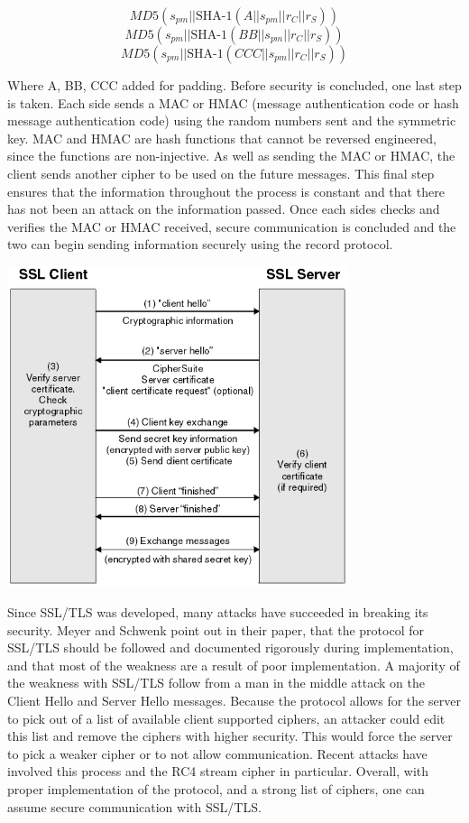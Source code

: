 \[ MD5(s_{pm}||\text{SHA-1}(A||s_{pm}||r_{C}||r_{S})) \]
\[ MD5(s_{pm}||\text{SHA-1}(BB||s_{pm}||r_{C}||r_{S})) \]
\[ MD5(s_{pm}||\text{SHA-1}(CCC||s_{pm}||r_{C}||r_{S})) \] 

Where A, BB, CCC added for padding\cite[p. 282]{trappe}.  Before security is
concluded, one last step is taken.  Each side sends a MAC or HMAC (message
authentication code or hash message authentication code) using the random
numbers sent and the symmetric key.  MAC and HMAC are hash functions that
cannot be reversed engineered, since the functions are non-injective.  As well
as sending the MAC or HMAC, the client sends another cipher to be used on the
future messages.  This final step ensures that the information throughout the
process is constant and that there has not been an attack on the information
passed.  Once each sides checks and verifies the MAC or HMAC received, secure
communication is concluded and the two can begin sending information
securely using the record protocol\cite[p. 58]{rescorla}.

\begin{center}
    \includegraphics[width=0.75\textwidth]{SSL_TLS_Diagram.png}
\end{center}

Since SSL/TLS was developed, many attacks have succeeded in breaking its
security.  Meyer and Schwenk point out in their paper, that the protocol for
SSL/TLS should be followed and documented rigorously during implementation, and
that most of the weakness are a result of poor implementation\cite[p.
14]{meyer}.  A majority of the weakness with SSL/TLS follow from a man in the
middle attack on the Client Hello and Server Hello messages.  Because the
protocol allows for the server to pick out of a list of available client
supported ciphers, an attacker could edit this list and remove the ciphers with
higher security.  This would force the server to pick a weaker cipher or to not
allow communication.  Recent attacks have involved this process and the RC4
stream cipher in particular.  Overall, with proper implementation of the
protocol, and a strong list of ciphers,  one can assume secure communication
with SSL/TLS.
